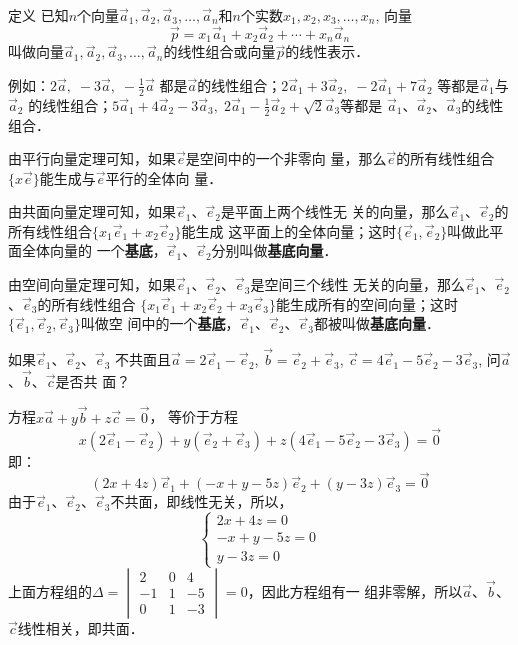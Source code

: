 \begin{blk}
 {定义} 已知$n$个向量$\vec{a}_1,\vec{a}_2,\vec{a}_3,\ldots, \vec{a}_n$和$n$个实数$x_1,x_2,x_3,\ldots,x_n$, 向量
 \[\vec{p}=x_1\vec{a}_1+x_2\vec{a}_2+\cdots+x_n\vec{a}_n\]
叫做向量$\vec{a}_1,\vec{a}_2,\vec{a}_3,\ldots, \vec{a}_n$的线性组合或向量$\vec{p}$的线性表示．
\end{blk}

例如：$2\vec{a},\; -3\vec{a},\; -\frac{1}{2}\vec{a}$
都是$\vec{a}$的线性组合；$2\vec{a}_1+3\vec{a}_2,\; -2\vec{a}_1+7\vec{a}_2$
等都是$\vec{a}_1$与$\vec{a}_2$
的线性组合；$5\vec{a}_1+4\vec{a}_2-3\vec{a}_3,\;  2\vec{a}_1-\frac{1}{2}\vec{a}_2+\sqrt{2}\vec{a}_3$等都是
$\vec{a}_1$、$\vec{a}_2$、$\vec{a}_3$的线性组合．

由平行向量定理可知，如果$\vec{e}$是空间中的一个非零向
量，那么$\vec{e}$的所有线性组合$\{x\vec{e}\}$能生成与$\vec{e}$平行的全体向
量．

由共面向量定理可知，如果$\vec{e}_1$、$\vec{e}_2$是平面上两个线性无
关的向量，那么$\vec{e}_1$、$\vec{e}_2$的所有线性组合$\{x_1\vec{e}_1+x_2\vec{e}_2\}$能生成
这平面上的全体向量；这时$\{\vec{e}_1,\vec{e}_2\}$叫做此平面全体向量的
一个\textbf{基底}，$\vec{e}_1$、$\vec{e}_2$分别叫做\textbf{基底向量}．

由空间向量定理可知，如果$\vec{e}_1$、$\vec{e}_2$、$\vec{e}_3$是空间三个线性
无关的向量，那么$\vec{e}_1$、$\vec{e}_2$、$\vec{e}_3$的所有线性组合
$\{x_1\vec{e}_1+x_2\vec{e}_2+x_3\vec{e}_3\}$能生成所有的空间向量；这时$\{\vec{e}_1,\vec{e}_2,\vec{e}_3\}$叫做空
间中的一个\textbf{基底}，$\vec{e}_1$、$\vec{e}_2$、$\vec{e}_3$都被叫做\textbf{基底向量}．

\begin{example}
    如果$\vec{e}_1$、$\vec{e}_2$、$\vec{e}_3$
不共面且$\vec{a}=2\vec{e}_1-\vec{e}_2$, 
$\vec{b}=\vec{e}_2+\vec{e}_3$, $\vec{c}=4\vec{e}_1-5\vec{e}_2-3\vec{e}_3$, 问$\vec{a}$、$\vec{b}$、$\vec{c}$是否共
面？
\end{example}

\begin{solution}
    方程$x\vec{a}+y\vec{b}+z\vec{c}=\vec{0}$，
等价于方程
\[
x(2\vec{e}_1-\vec{e}_2)+y(\vec{e}_2+\vec{e}_3)+z(4\vec{e}_1-5\vec{e}_2-3\vec{e}_3)=\vec{0}\]
即：
\[(2x+4z)\vec{e}_1+(-x+y-5z)\vec{e}_2+(y-3z)\vec{e}_3=\vec{0}\]
由于$\vec{e}_1$、$\vec{e}_2$、$\vec{e}_3$不共面，即线性无关，所以，
\[\begin{cases}
    2x+4z=0\\ -x+y-5z=0\\ y-3z=0
\end{cases}\]
上面方程组的$\Delta=\begin{vmatrix}
    2&0&4\\
    -1&1&-5\\
    0&1&-3
\end{vmatrix}=0$，因此方程组有一
组非零解，所以$\vec{a}$、$\vec{b}$、$\vec{c}$线性相关，即共面．
\end{solution}


